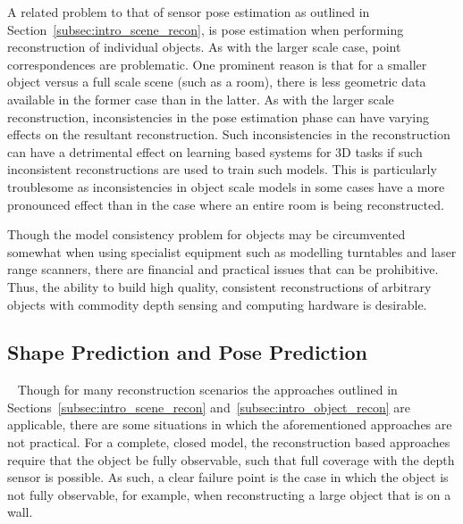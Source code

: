 A related problem to that of sensor pose estimation as outlined in Section~\ref{subsec:intro_scene_recon}, 
is pose estimation when performing reconstruction of individual objects. As with the larger scale case, point 
correspondences are problematic. One prominent reason is that for a smaller object versus a full scale scene 
(such as a room), there is less geometric data available in the former case than in the latter. As with the larger 
scale reconstruction, inconsistencies in the pose estimation phase can have varying effects on the resultant 
reconstruction. Such inconsistencies in the reconstruction can have a detrimental effect on learning based systems 
for 3D tasks if such inconsistent reconstructions are used to train such models. This is particularly troublesome as 
inconsistencies in object scale models in some cases have a more pronounced effect than in the case where 
an entire room is being reconstructed.

Though the model consistency problem for objects may be circumvented somewhat when using specialist equipment 
such as modelling turntables and laser range scanners, there are financial and practical issues that can be 
prohibitive. Thus, the ability to build high quality, consistent reconstructions of arbitrary objects with 
commodity depth sensing and computing hardware is desirable.

\subsection{Shape Prediction and Pose Prediction}
~\label{subsec:intro_spp}
Though for many reconstruction scenarios the approaches outlined in Sections~\ref{subsec:intro_scene_recon} 
and~\ref{subsec:intro_object_recon} are applicable, there are some situations in which the aforementioned 
approaches are not practical. For a complete, closed model, the reconstruction based approaches require that 
the object be fully observable, such that full coverage with the depth sensor is possible. As such, a clear 
failure point is the case in which the object is not fully observable, for example, when reconstructing a large 
object that is on a wall.


